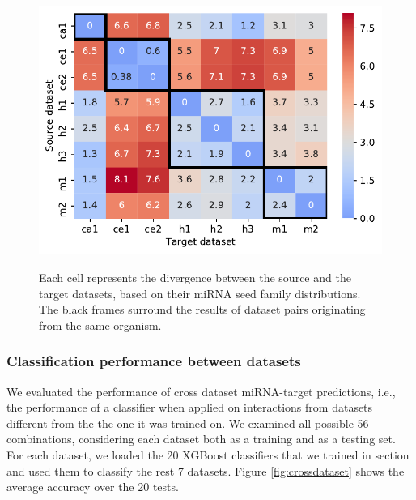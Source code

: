\documentclass{bmcart}
\begin{document}
\begin{figure}[h!]
  \caption{ Each cell represents the divergence between the source and the target datasets, based on their miRNA seed family distributions. The black frames surround the results of dataset pairs originating from the same organism.}
      \includegraphics[width = 1\textwidth]{Results/divergence.pdf}
      \label{fig:divergence}
      \end{figure}


\subsubsection*{Classification performance between datasets}
We evaluated the performance of cross dataset miRNA-target predictions, i.e., the performance of a classifier when applied on interactions from datasets different from the the one it was trained on.
We examined all possible 56 combinations, considering each dataset both as a training and as a testing set. 
For each dataset, we loaded the 20 XGBoost classifiers that we trained in section  and used them to classify the rest 7 datasets. Figure \ref{fig:crossdataset} shows the average accuracy over the 20 tests. 
\end{document}
